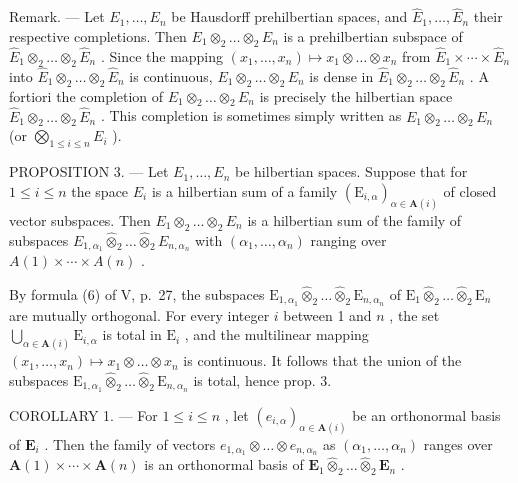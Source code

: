 Remark. --- Let \(E_{1}, \ldots, E_{n}\) be Hausdorff prehilbertian spaces, and \(\hat{E}_{1}, \ldots, \hat{E}_{n}\) their respective completions. Then \(E_{1} \otimes_{2} \ldots \otimes_{2} E_{n}\) is a prehilbertian subspace of \(\hat{E}_{1} \otimes_{2} \ldots \otimes_{2} \hat{E}_{n}\) . Since the mapping \((x_{1}, \ldots, x_{n}) \mapsto x_{1} \otimes \ldots \otimes x_{n}\) from \(\hat{E}_{1} \times \cdots \times \hat{E}_{n}\) into \(\hat{E}_{1} \otimes_{2} \ldots \otimes_{2} \hat{E}_{n}\) is continuous, \(E_{1} \otimes_{2} \ldots \otimes_{2} E_{n}\) is dense in \(\hat{E}_{1} \otimes_{2} \ldots \otimes_{2} \hat{E}_{n}\) . A fortiori the completion of \(E_{1} \otimes_{2} \ldots \otimes_{2} E_{n}\) is precisely the hilbertian space \(\hat{E}_{1} \otimes_{2} \ldots \otimes_{2} \hat{E}_{n}\) . This completion is sometimes simply written as \(E_{1} \otimes_{2} \ldots \otimes_{2} E_{n}\) (or \(\bigotimes_{1 \leq i \leq n} E_{i}\) ).

PROPOSITION 3. --- Let \(E_{1}, \ldots, E_{n}\) be hilbertian spaces. Suppose that for \(1 \leqslant i \leqslant n\) the space \(E_{i}\) is a hilbertian sum of a family \((\mathrm{E}_{i,\alpha})_{\alpha \in \mathbf{A}(i)}\) of closed vector subspaces. Then \(E_{1} \otimes_{2} \ldots \otimes_{2} E_{n}\) is a hilbertian sum of the family of subspaces \(E_{1,\alpha_{1}} \hat{\otimes}_{2} \ldots \hat{\otimes}_{2} E_{n,\alpha_{n}}\) with \((\alpha_{1}, \ldots, \alpha_{n})\) ranging over \(A(1) \times \cdots \times A(n)\) .

By formula (6) of V, p.~27, the subspaces \(\mathrm{E}_{1,\alpha_1}\hat{\otimes}_2\ldots \hat{\otimes}_2\mathrm{E}_{n,\alpha_n}\) of \(\mathrm{E}_1\hat{\otimes}_2\ldots \hat{\otimes}_2\mathrm{E}_n\) are mutually orthogonal. For every integer \(i\) between 1 and \(n\) , the set \(\bigcup_{\alpha \in \mathbf{A}(i)}\mathrm{E}_{i,\alpha}\) is total in \(\mathrm{E}_i\) , and the multilinear mapping \((x_{1},\dots,x_{n})\mapsto x_{1}\otimes \dots \otimes x_{n}\) is continuous. It follows that the union of the subspaces \(\mathrm{E}_{1,\alpha_1}\hat{\otimes}_2\ldots \hat{\otimes}_2\mathrm{E}_{n,\alpha_n}\) is total, hence prop. 3.

COROLLARY 1. --- For \(1 \leqslant i \leqslant n\) , let \((e_{i,\alpha})_{\alpha \in \mathbf{A}(i)}\) be an orthonormal basis of \(\mathbf{E}_i\) . Then the family of vectors \(e_{1,\alpha_1} \otimes \ldots \otimes e_{n,\alpha_n}\) as \((\alpha_1, \ldots, \alpha_n)\) ranges over \(\mathbf{A}(1) \times \cdots \times \mathbf{A}(n)\) is an orthonormal basis of \(\mathbf{E}_1 \hat{\otimes}_2 \ldots \hat{\otimes}_2 \mathbf{E}_n\) .

